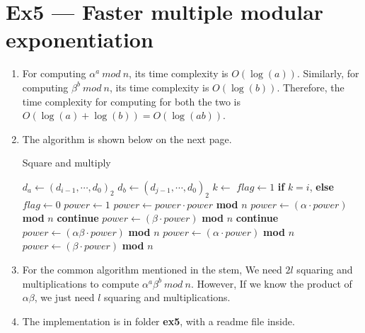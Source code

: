 \documentclass[12pt, a4paper]{article}
\begin{document}
\section*{Ex5 --- Faster multiple modular exponentiation}
\begin{enumerate}
    \item For computing $\alpha^a\ mod\ n$, its time complexity is $O(\log(a))$. Similarly, 
          for computing $\beta^b\ mod\ n$, its time complexity is $O(\log(b))$. 
          Therefore, the time complexity for computing for both the two is $O(\log(a)+\log(b)) = O(\log(ab))$.
    \item The algorithm is shown below on the next page.
            \begin{algorithm}
                \caption{Square and multiply}
                \begin{algorithmic}
                    \State $d_a \gets (d_{i-1},\cdots,d_0)_2$
                    \State $d_b \gets (d_{j-1},\cdots,d_0)_2$
                    \State $k \gets$ 
                    \State $flag \gets 1$ \textbf{if} $k = i$, \textbf{else} $flag \gets 0$
                    \State $power \gets 1$
                        \State $power \gets power \cdot power$ \textbf{mod} $n$
                                \State $power \gets (\alpha\cdot power)$ \textbf{mod} $n$
                            \EndIf
                            \State \textbf{continue}
                        \EndIf
                                \State $power \gets (\beta\cdot power)$ \textbf{mod} $n$
                            \EndIf
                            \State \textbf{continue}
                        \EndIf
                            \State $power \gets (\alpha\beta\cdot power)$ \textbf{mod} $n$
                            \State $power \gets (\alpha\cdot power)$ \textbf{mod} $n$
                            \State $power \gets (\beta\cdot power)$ \textbf{mod} $n$
                        \EndIf
                    \EndFor
                    \State {}  
                \end{algorithmic}  
            \end{algorithm}  


    \item For the common algorithm mentioned in the stem, 
          We need $2l$ squaring and multiplications to compute $\alpha^a \beta^b \ mod\ n$. However, 
          If we know the product of $\alpha\beta$, we just need $l$ squaring and multiplications.
    \item The implementation is in folder \textbf{ex5}, with a readme file inside.
\end{enumerate}
\end{document}
